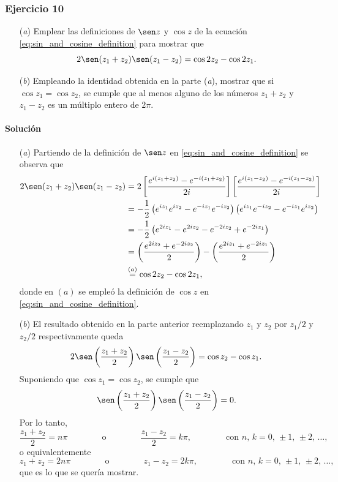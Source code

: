 \documentclass[a4paper]{report}
\begin{document}
\subsubsection{Ejercicio 10}

\begin{enumerate}
 \item[(\textit{a})] Emplear las definiciones de \(\sen z\) y \(\cos z\) de la ecuación \ref{eq:sin_and_cosine_definition} para mostrar que 
 \[
  2\sen(z_1+z_2)\sen(z_1-z_2)=\cos2z_2-\cos2z_1.
 \]
 \item[(\textit{b})] Empleando la identidad obtenida en la parte (\textit{a}), mostrar que si \(\cos z_1=\cos z_2\), se cumple que al menos alguno de los números \(z_1+z_2\) y \(z_1-z_2\) es un múltiplo entero de \(2\pi\).
\end{enumerate} 

\paragraph{Solución} 

\begin{enumerate}
 \item[(\textit{a})] Partiendo de la definición de \(\sen z\) en \ref{eq:sin_and_cosine_definition} se observa que 
 \begin{align*}
  2\sen(z_1+z_2)\sen(z_1-z_2)&=2\left[\frac{e^{i(z_1+z_2)}-e^{-i(z_1+z_2)}}{2i}\right]\left[\frac{e^{i(z_1-z_2)}-e^{-i(z_1-z_2)}}{2i}\right]\\
  &=-\frac{1}{2}\left(e^{iz_1}e^{iz_2}-e^{-iz_1}e^{-iz_2}\right)\left(e^{iz_1}e^{-iz_2}-e^{-iz_1}e^{iz_2}\right)\\
  &=-\frac{1}{2}\left(e^{2iz_1}-e^{2iz_2}-e^{-2iz_2}+e^{-2iz_1}\right)\\
  &=\left(\frac{e^{2iz_2}+e^{-2iz_2}}{2}\right)-\left(\frac{e^{2iz_1}+e^{-2iz_1}}{2}\right)\\
  &\overset{(a)}{=}\cos2z_2-\cos2z_1,
 \end{align*}
 donde en \((a)\) se empleó la definición de \(\cos z\) en \ref{eq:sin_and_cosine_definition}.
 \item[(\textit{b})] El resultado obtenido en la parte anterior reemplazando \(z_1\) y \(z_2\) por \(z_1/2\) y \(z_2/2\) respectivamente queda
 \[
  2\sen\left(\frac{z_1+z_2}{2}\right)\sen\left(\frac{z_1-z_2}{2}\right)=\cos z_2-\cos z_1.
 \]
 Suponiendo que \(\cos z_1=\cos z_2\), se cumple que 
 \[
  \sen\left(\frac{z_1+z_2}{2}\right)\sen\left(\frac{z_1-z_2}{2}\right)=0.
 \]
 Por lo tanto,
 \[
  \frac{z_1+z_2}{2}=n\pi
  \qquad\qquad\textrm{o}\qquad\qquad
  \frac{z_1-z_2}{2}=k\pi,
  \qquad\qquad\textrm{con }
  n,\,k=0,\,\pm1,\,\pm2,\,\dots,
 \]
 o equivalentemente
 \[
  z_1+z_2=2n\pi
  \qquad\qquad\textrm{o}\qquad\qquad
  z_1-z_2=2k\pi,
  \qquad\qquad\textrm{con }
  n,\,k=0,\,\pm1,\,\pm2,\,\dots,
 \]
 que es lo que se quería mostrar.
\end{enumerate} 
\end{document}
